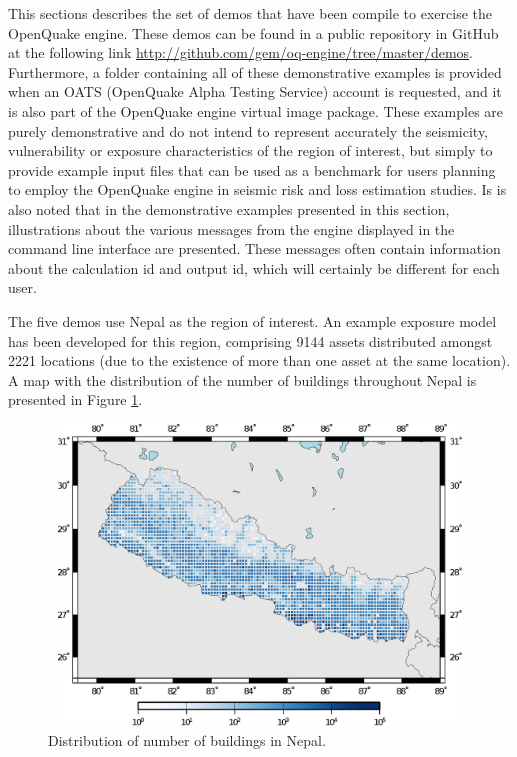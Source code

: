 This sections describes the set of demos that have been compile to exercise the OpenQuake engine. These demos can be found in a public repository in GitHub at the following link \href{http://github.com/gem/oq-engine/tree/master/demos}{http://github.com/gem/oq-engine/tree/master/demos}. Furthermore, a folder containing all of these demonstrative examples is provided when an OATS (OpenQuake Alpha Testing Service) account is requested, and it is also part of the OpenQuake engine virtual image package. These examples are purely demonstrative and do not intend to represent accurately the seismicity, vulnerability or exposure characteristics of the region of interest, but simply to provide example input files that can be used as a benchmark for users planning to employ the OpenQuake engine in seismic risk and loss estimation studies. Is is also noted that in the demonstrative examples presented in this section, illustrations about the various messages from the engine displayed in the command line interface are presented. These messages often contain information about the calculation id and output id, which will certainly be different for each user.

The five demos use Nepal as the region of interest. An example \gls{exposure model} has been developed for this region, comprising 9144 assets distributed amongst 2221 locations (due to the existence of more than one \gls{asset} at the same location). A map with the distribution of the number of buildings throughout Nepal is presented in Figure \ref{fig:expNepal}. 

\begin{figure}[ht]
\centering
\includegraphics[width=12cm,height=8cm]{./figures/risk/NepalExposure.eps}
\caption{Distribution of number of buildings in Nepal.}
\label{fig:expNepal}
\end{figure}

